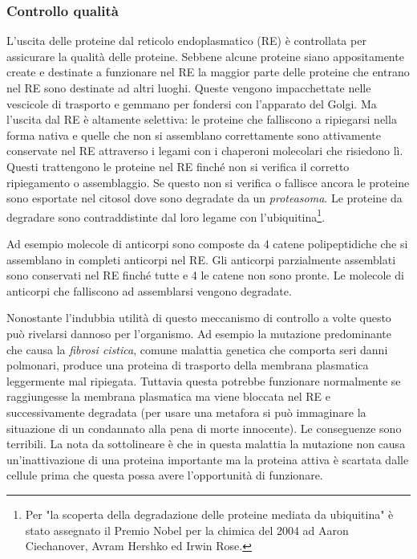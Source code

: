 {{\subsubsection{Controllo qualità}
L'uscita delle proteine dal reticolo endoplasmatico (RE) è controllata per assicurare la qualità delle proteine. Sebbene alcune proteine siano appositamente create e destinate a funzionare nel RE la maggior parte delle proteine che entrano nel RE sono destinate ad altri luoghi. Queste vengono impacchettate nelle vescicole di trasporto e gemmano per fondersi con l'apparato del Golgi. Ma l'uscita dal RE è altamente selettiva: le proteine che falliscono a ripiegarsi nella forma nativa e quelle che non si assemblano correttamente sono attivamente conservate nel RE attraverso i legami con i chaperoni molecolari che risiedono lì. Questi trattengono le proteine nel RE finché non si verifica il corretto ripiegamento o assemblaggio. Se questo non si verifica o fallisce ancora le proteine sono esportate nel citosol dove sono degradate da un \textit{proteasoma}. Le proteine da degradare sono contraddistinte dal loro legame con l'ubiquitina\footnote{Per "la scoperta della degradazione delle proteine mediata da ubiquitina" è stato assegnato il Premio Nobel per la chimica del 2004 ad Aaron Ciechanover, Avram Hershko ed Irwin Rose.}.

\par Ad esempio molecole di anticorpi sono composte da 4 catene polipeptidiche che si assemblano in completi anticorpi nel RE. Gli anticorpi parzialmente assemblati sono conservati nel RE finché tutte e 4 le catene non sono pronte. Le molecole di anticorpi che falliscono ad assemblarsi vengono degradate.


\par Nonostante l'indubbia utilità di questo meccanismo di controllo a volte questo può rivelarsi dannoso per l'organismo. Ad esempio la mutazione predominante che causa la \textit{fibrosi cistica}, comune malattia genetica che comporta seri danni polmonari, produce una proteina di trasporto della membrana plasmatica leggermente mal ripiegata. Tuttavia questa potrebbe funzionare normalmente se raggiungesse la membrana plasmatica ma viene bloccata nel RE e successivamente degradata\supercite{alberts2018essential} (per usare una metafora si può immaginare la situazione di un condannato alla pena di morte innocente). Le conseguenze sono terribili. La nota da sottolineare è che in questa malattia la mutazione non causa un'inattivazione di una proteina importante ma la proteina attiva è scartata dalle cellule prima che questa possa avere l'opportunità di funzionare. \\

}}
